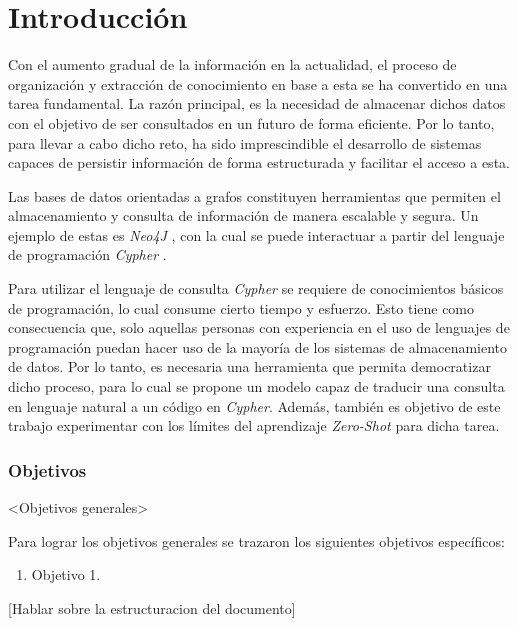 \chapter*{Introducción}\label{chapter:introduction}

\qquad 

Con el aumento gradual de la información en la actualidad, el proceso de organización y extracción de conocimiento en base a esta se ha convertido en una tarea fundamental. La razón principal, es la necesidad de almacenar dichos datos con el objetivo de ser consultados en un futuro de forma eficiente. Por lo tanto, para llevar a cabo dicho reto, ha sido imprescindible el desarrollo de sistemas capaces de persistir información de forma estructurada y facilitar el acceso a esta.

Las bases de datos orientadas a grafos \cite{graphdbs} constituyen herramientas que permiten el almacenamiento y consulta de información de manera escalable y segura. Un ejemplo de estas es \textit{Neo4J} \cite{neo4j}, con la cual se puede interactuar a partir del lenguaje de programación \textit{Cypher} \cite{cypher}.

Para utilizar el lenguaje de consulta \textit{Cypher} se requiere de conocimientos básicos de programación, lo cual consume cierto tiempo y esfuerzo. Esto tiene como consecuencia que, solo aquellas personas con experiencia en el uso de lenguajes de programación puedan hacer uso de la mayoría de los sistemas de almacenamiento de datos. Por lo tanto, es necesaria una herramienta que permita democratizar dicho proceso, para lo cual se propone un modelo capaz de traducir una consulta en lenguaje natural a un código en \textit{Cypher}. Además, también es objetivo de este trabajo experimentar con los límites del aprendizaje \textit{Zero-Shot} \cite{zeroshot} para dicha tarea. 

\subsection*{Objetivos}
<Objetivos generales>

Para lograr los objetivos generales se trazaron los siguientes objetivos específicos:

\begin{enumerate}
	\item Objetivo 1.
\end{enumerate}


[Hablar sobre la estructuracion del documento]




